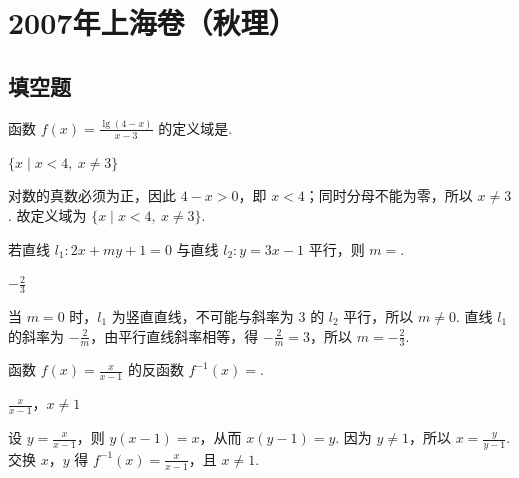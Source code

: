 
\chapter{2007年上海卷（秋理）}
\section{填空题}
\begin{problem}
函数 \( f(x)=\frac{\lg(4-x)}{x-3} \) 的定义域是\fillinblank{}.
\end{problem}

\begin{answer}
\(\{x\mid x<4,\ x\ne3\}\)
\end{answer}

\begin{solution}
对数的真数必须为正，因此 \(4-x>0\)，即 \(x<4\)；同时分母不能为零，所以 \(x\ne3\). 故定义域为 \(\{x\mid x<4,\ x\ne3\}\).
\end{solution}

\begin{problem}
若直线 \(l_{1}: 2x + my + 1 = 0\) 与直线 \(l_{2}: y = 3x - 1\) 平行，则 \(m = \)\fillinblank{}.
\end{problem}

\begin{answer}
\(-\frac{2}{3}\)
\end{answer}

\begin{solution}
当 \(m=0\) 时，\(l_1\) 为竖直直线，不可能与斜率为 \(3\) 的 \(l_2\) 平行，所以 \(m\ne0\). 直线 \(l_1\) 的斜率为 \(-\frac{2}{m}\)，由平行直线斜率相等，得 \(-\frac{2}{m}=3\)，所以 \(m=-\frac{2}{3}\).
\end{solution}

\begin{problem}
函数 \( f(x)=\frac{x}{x-1} \) 的反函数 \( f^{-1}(x)= \)\fillinblank{}.
\end{problem}

\begin{answer}
\(\frac{x}{x-1}\)，\(x\ne1\)
\end{answer}

\begin{solution}
设 \(y=\frac{x}{x-1}\)，则 \(y(x-1)=x\)，从而 \(x(y-1)=y\). 因为 \(y\ne1\)，所以 \(x=\frac{y}{y-1}\). 交换 \(x\)，\(y\) 得 \(f^{-1}(x)=\frac{x}{x-1}\)，且 \(x\ne1\).
\end{solution}

